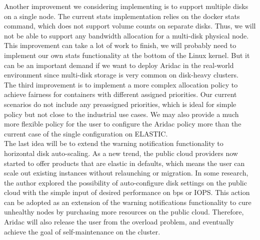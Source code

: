 \documentclass[10pt, conference,compsoc]{IEEEtran}
\begin{document}
Another improvement we considering implementing is to support multiple disks on a single node. The current stats implementation relies on the docker stats command, which does not support volume counts on separate disks. Thus, we will not be able to support any bandwidth allocation for a multi-disk physical node. This improvement can take a lot of work to finish, we will probably need to implement our own stats functionality at the bottom of the Linux kernel. But it can be an important demand if we want to deploy Aridac in the real-world environment since multi-disk storage is very common on disk-heavy clusters.\\

The third improvement is to implement a more complex allocation policy to achieve fairness for containers with different assigned priorities. Our current scenarios do not include any preassigned priorities, which is ideal for simple policy but not close to the industrial use cases. We may also provide a much more flexible policy for the user to configure the Aridac policy more than the current case of the single configuration on ELASTIC.\\

The last idea will be to extend the warning notification functionality to horizontal disk auto-scaling. As a new trend, the public cloud providers now started to offer products that are elastic in defaults, which means the user can scale out existing instances without relaunching or migration. In some research\cite{park2020more}, the author explored the possibility of auto-configure disk settings on the public cloud with the simple input of desired performance on bps or IOPS. This action can be adopted as an extension of the warning notifications functionality to cure unhealthy nodes by purchasing more resources on the public cloud. Therefore, Aridac will also release the user from the overload problem, and eventually achieve the goal of self-maintenance on the cluster.\\









\newpage
\end{document}
